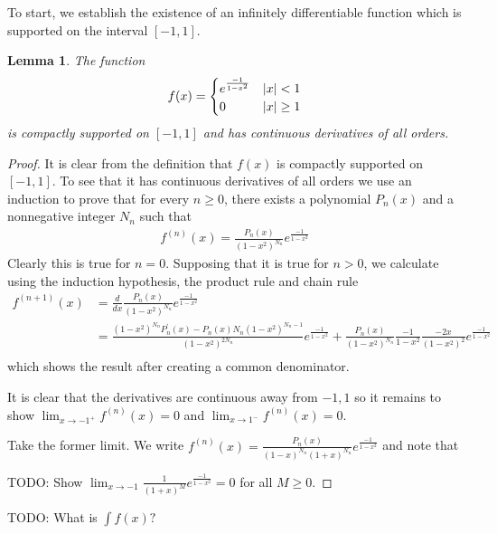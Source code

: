 \documentclass{amsart}
\newtheorem{lem}[thm]{Lemma}
\theoremstyle{remark}
\theoremstyle{definition}
\begin{document}
To start, we establish the existence of an infinitely differentiable
function which is supported on the interval $[-1,1]$.

\begin{lem}The function 
\begin{align*}
f(x) = \begin{cases}
e^\frac{-1}{1-x^2} & \left \vert x \right \vert < 1\\
0 & \left \vert x \right \vert \geq 1
\end{cases}
\end{align*} is compactly supported on $[-1,1]$ and has continuous
derivatives of all orders.
\end{lem}
\begin{proof}
It is clear from the definition that $f(x)$ is compactly supported on
$[-1,1]$.  To see that it has continuous derivatives of all orders we
use an induction to prove that for every $n\geq 0$, there exists a
polynomial $P_n(x)$ and a nonnegative integer $N_n$ such that 
\begin{align*}
f^{(n)}(x) = \frac{P_n(x)}{(1 - x^2)^{N_n}} e^\frac{-1}{1-x^2}
\end{align*}
Clearly this is true for $n=0$.  Supposing that it is true for $n >0$,
we calculate using the induction hypothesis, the product rule and
chain rule
\begin{align*}
f^{(n+1)}(x) &= \frac{d}{dx}\frac{P_n(x)}{(1 - x^2)^{N_n}}
e^\frac{-1}{1-x^2} \\
&= \frac{(1 - x^2)^{N_n} P_n^\prime(x) - P_n(x) N_n (1- x^2)^{N_n
    -1}}{(1 - x^2)^{2N_n}}e^\frac{-1}{1-x^2} + \frac{P_n(x)}{(1 - x^2)^{N_n}}\frac{-1}{1-x^2} \frac{-2x}{(1-x^2)^2}
e^\frac{-1}{1-x^2} \\
\end{align*}
which shows the result after creating a common denominator.

It is clear that the derivatives are continuous away from ${-1,1}$ so
it remains to show $\lim_{x \to -1^+} f^{(n)}(x) = 0$ and $\lim_{x \to
  1^-} f^{(n)}(x) = 0$.

Take the former limit.  We write $f^{(n)}(x) = \frac{P_n(x)}{(1 -
  x)^{N_n}(1 + x)^{N_n}} e^\frac{-1}{1-x^2}$ and note that


TODO: Show $\lim_{x \to -1} \frac{1}{(1 + x)^M} e^\frac{-1}{1-x^2} = 0$
for all $M \geq 0$.
\end{proof}

TODO: What is $\int f(x)?$
\end{document}

